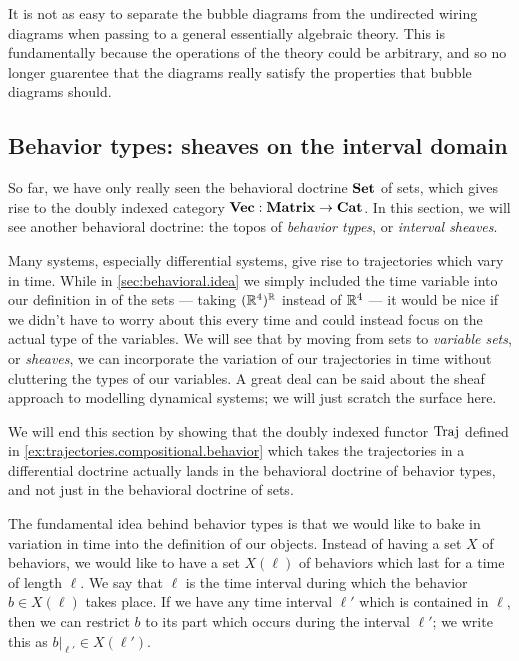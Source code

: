 \documentclass[DynamicalBook]{subfiles}
\begin{document}
          \begin{remark}
            It is not as easy to separate the bubble diagrams from the undirected wiring diagrams when passing to a general essentially algebraic theory. This is fundamentally because the operations of the theory could be arbitrary, and so no longer guarentee that the diagrams really satisfy the properties that bubble diagrams should.
          \end{remark}



\subsection{Behavior types: sheaves on the interval domain}\label{sec:behavioral.types}

So far, we have only really seen the behavioral doctrine $\textbf{Set}$ of sets, which gives rise to the doubly indexed category $\textbf{Vec} : \textbf{Matrix} \to \textbf{Cat}$. In this section, we will see another behavioral doctrine: the topos of \emph{behavior types}, or \emph{interval sheaves}.

Many systems, especially differential systems, give rise to trajectories which vary in time. While in \cref{sec:behavioral.idea} we simply included the time variable into our definition in of the sets --- taking $(\mathbb{R}^{4})^{\mathbb{R}}$ instead of $\mathbb{R}^{4}$ --- it would be nice if we didn't have to worry about this every time and could instead focus on the actual type of the variables. We will see that by moving from sets to \emph{variable sets}, or \emph{sheaves}, we can incorporate the variation of our trajectories in time without cluttering the types of our variables.
A great deal can be said about the sheaf approach to modelling dynamical systems; we will just scratch the surface here.

We will end this section by showing that the doubly indexed functor $\mathrm{Traj}$ defined in \cref{ex:trajectories.compositional.behavior} which takes the trajectories in a differential doctrine actually lands in the behavioral doctrine of behavior types, and not just in the behavioral doctrine of sets.

The fundamental idea behind behavior types is that we would like to bake in variation in time into the definition of our objects. Instead of having a set $X$ of behaviors, we would like to have a set $X(\ell)$ of behaviors which last for a time of length $\ell$.  We say that $\ell$ is the time interval during which the behavior $b \in X(\ell)$ takes place. If we have any time interval $\ell'$ which is contained in $\ell$, then we can restrict $b$ to its part which occurs during the interval $\ell'$; we write this as $b|_{\ell'} \in X(\ell')$.
\end{document}
